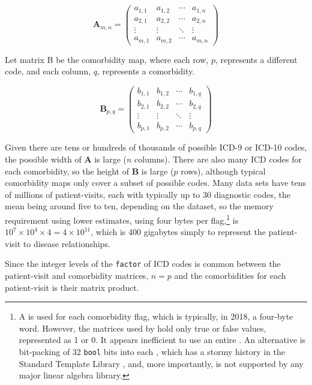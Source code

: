 \documentclass[article]{jss}
\begin{document}
\[\boldsymbol{A}_{m,n} =
\begin{pmatrix}
a_{1,1} & a_{1,2} & \cdots & a_{1,n} \\
a_{2,1} & a_{2,2} & \cdots & a_{2,n} \\
\vdots  & \vdots  & \ddots & \vdots  \\
a_{m,1} & a_{m,2} & \cdots & a_{m,n}
\end{pmatrix}\]\label{eq:A}

Let matrix B be the comorbidity map, where each row, \(p\), represents a
different code, and each column, \(q\), represents a comorbidity.

\[ \boldsymbol{B}_{p,q} =
\begin{pmatrix}
b_{1,1} & b_{1,2} & \cdots & b_{1,q} \\
b_{2,1} & b_{2,2} & \cdots & b_{2,q} \\
\vdots  & \vdots  & \ddots & \vdots  \\
b_{p,1} & b_{p,2} & \cdots & b_{p,q}
\end{pmatrix}\]\label{eq:B}

Given there are tens or hundreds of thousands of possible ICD-9 or
ICD-10 codes, the possible width of \(\boldsymbol{A}\) is large (\(n\)
columns). There are also many ICD codes for each comorbidity, so the
height of \(\boldsymbol{B}\) is large (\(p\) rows), although typical
comorbidity maps only cover a subset of possible codes. Many data sets
have tens of millions of patient-visits, each with typically up to 30
diagnostic codes, the mean being around five to ten, depending on the
dataset, so the memory requirement using lower estimates, using four
bytes per flag,\footnote{A   is used for each
  comorbidity flag, which is typically, in 2018, a four-byte word.
  However, the matrices used by  hold only true or false
  values, represented as 1 or 0. It appears inefficient to use an entire
  . An alternative is bit-packing of 32 \texttt{bool} bits
  into each , which has a stormy history in the 
  Standard Template Library
  \citep{Jarvi_AlgorithmSpecializationGeneric_2006}, and, more
  importantly, is not supported by any major linear algebra library.} is
\(10^7 \times 10^4 \times 4 = 4 \times 10^{11}\), which is 400 gigabytes
simply to represent the patient-visit to disease relationships.

Since the integer levels of the \texttt{factor} of ICD codes is common
between the patient-visit and comorbidity matrices, \(n = p\) and the
comorbidities for each patient-visit is their matrix product.
\end{document}
